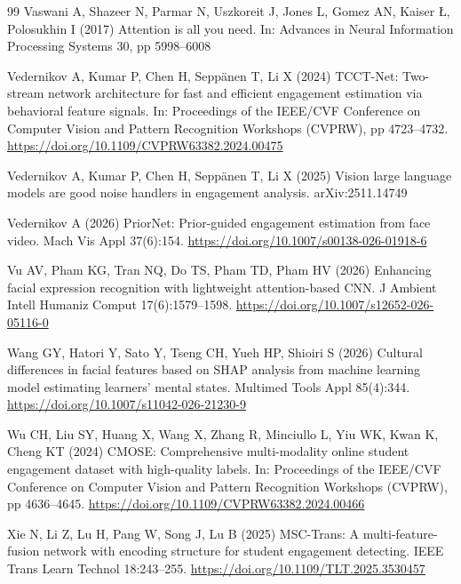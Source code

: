 \documentclass[pdflatex,iicol,sn-basic]{sn-jnl}
\begin{document}
\begin{thebibliography}{99}
Vaswani A, Shazeer N, Parmar N, Uszkoreit J, Jones L, Gomez AN, Kaiser {\L}, Polosukhin I (2017) Attention is all you need. In: Advances in Neural Information Processing Systems 30, pp 5998--6008

Vedernikov A, Kumar P, Chen H, Sepp\"{a}nen T, Li X (2024) TCCT-Net: Two-stream network architecture for fast and efficient engagement estimation via behavioral feature signals. In: Proceedings of the IEEE/CVF Conference on Computer Vision and Pattern Recognition Workshops (CVPRW), pp 4723--4732. \url{https://doi.org/10.1109/CVPRW63382.2024.00475}

Vedernikov A, Kumar P, Chen H, Sepp\"{a}nen T, Li X (2025) Vision large language models are good noise handlers in engagement analysis. arXiv:2511.14749

Vedernikov A (2026) PriorNet: Prior-guided engagement estimation from face video. Mach Vis Appl 37(6):154. \url{https://doi.org/10.1007/s00138-026-01918-6}

Vu AV, Pham KG, Tran NQ, Do TS, Pham TD, Pham HV (2026) Enhancing facial expression recognition with lightweight attention-based CNN. J Ambient Intell Humaniz Comput 17(6):1579--1598. \url{https://doi.org/10.1007/s12652-026-05116-0}

Wang GY, Hatori Y, Sato Y, Tseng CH, Yueh HP, Shioiri S (2026) Cultural differences in facial features based on SHAP analysis from machine learning model estimating learners' mental states. Multimed Tools Appl 85(4):344. \url{https://doi.org/10.1007/s11042-026-21230-9}

Wu CH, Liu SY, Huang X, Wang X, Zhang R, Minciullo L, Yiu WK, Kwan K, Cheng KT (2024) CMOSE: Comprehensive multi-modality online student engagement dataset with high-quality labels. In: Proceedings of the IEEE/CVF Conference on Computer Vision and Pattern Recognition Workshops (CVPRW), pp 4636--4645. \url{https://doi.org/10.1109/CVPRW63382.2024.00466}

Xie N, Li Z, Lu H, Pang W, Song J, Lu B (2025) MSC-Trans: A multi-feature-fusion network with encoding structure for student engagement detecting. IEEE Trans Learn Technol 18:243--255. \url{https://doi.org/10.1109/TLT.2025.3530457}


\end{thebibliography}
\end{document}
